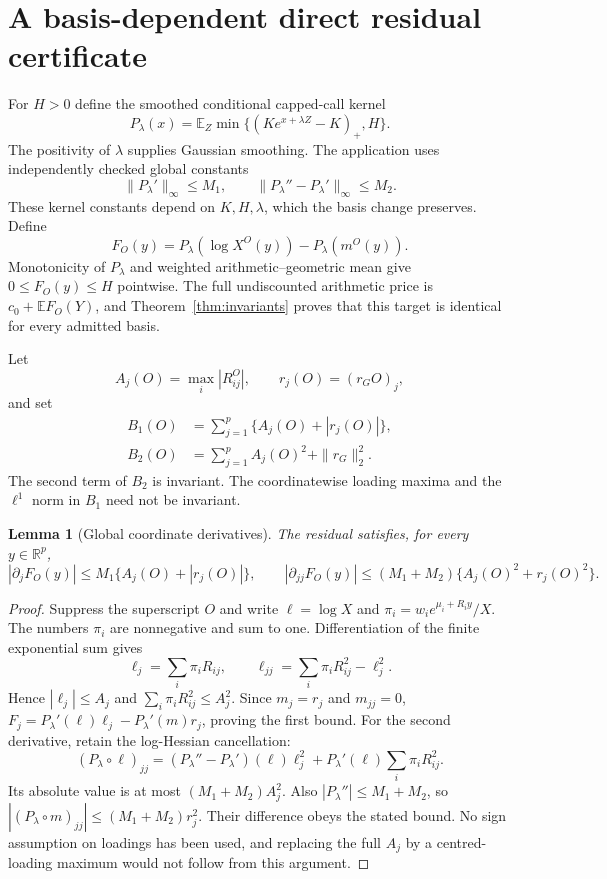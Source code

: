 \documentclass[11pt,a4paper]{article}
\newtheorem{lemma}[theorem]{Lemma}
\newcommand{\E}{\mathbb E}
\newcommand{\R}{\mathbb R}
\begin{document}
\section{A basis-dependent direct residual certificate}
For $H>0$ define the smoothed conditional capped-call kernel
\[
 P_\lambda(x)=\E_Z\min\{(Ke^{x+\lambda Z}-K)_+,H\}.
\]
The positivity of $\lambda$ supplies Gaussian smoothing. The application
uses independently checked global constants
\[
 \|P_\lambda'\|_\infty\leq M_1,
 \qquad \|P_\lambda''-P_\lambda'\|_\infty\leq M_2.
\]
These kernel constants depend on $K,H,\lambda$, which the basis change
preserves. Define
\[
 F_O(y)=P_\lambda(\log X^O(y))-P_\lambda(m^O(y)).
\]
Monotonicity of $P_\lambda$ and weighted arithmetic--geometric mean
give $0\leq F_O(y)\leq H$ pointwise. The full undiscounted arithmetic
price is $c_0+\E F_O(Y)$, and Theorem~\ref{thm:invariants} proves that this
target is identical for every admitted basis.

Let
\[
 A_j(O)=\max_i|R^O_{ij}|,\qquad r_j(O)=(r_GO)_j,
\]
and set
\begin{align*}
 B_1(O)&=\sum_{j=1}^p\{A_j(O)+|r_j(O)|\},\\
 B_2(O)&=\sum_{j=1}^p A_j(O)^2+\|r_G\|_2^2.
\end{align*}
The second term of $B_2$ is invariant. The coordinatewise loading maxima
and the $\ell^1$ norm in $B_1$ need not be invariant.

\begin{lemma}[Global coordinate derivatives]\label{lem:derivatives}
The residual satisfies, for every $y\in\R^p$,
\[
 |\partial_j F_O(y)|\leq M_1\{A_j(O)+|r_j(O)|\},
 \qquad
 |\partial_{jj}F_O(y)|\leq (M_1+M_2)
                  \{A_j(O)^2+r_j(O)^2\}.
\]
\end{lemma}
\begin{proof}
Suppress the superscript $O$ and write $\ell=\log X$ and
$\pi_i=w_i e^{\mu_i+R_i y}/X$. The numbers $\pi_i$ are nonnegative and
sum to one. Differentiation of the finite exponential sum gives
\[
 \ell_j=\sum_i\pi_iR_{ij},\qquad
 \ell_{jj}=\sum_i\pi_iR_{ij}^2-\ell_j^2.
\]
Hence $|\ell_j|\leq A_j$ and
$\sum_i\pi_iR_{ij}^2\leq A_j^2$. Since $m_j=r_j$ and $m_{jj}=0$,
$F_j=P_\lambda'(\ell)\ell_j-P_\lambda'(m)r_j$, proving the first bound.
For the second derivative, retain the log-Hessian cancellation:
\[
 (P_\lambda\circ\ell)_{jj}
 =(P_\lambda''-P_\lambda')(\ell)\ell_j^2
   +P_\lambda'(\ell)\sum_i\pi_i R_{ij}^2.
\]
Its absolute value is at most $(M_1+M_2)A_j^2$.
Also $|P_\lambda''|\leq M_1+M_2$, so
$|(P_\lambda\circ m)_{jj}|\leq(M_1+M_2)r_j^2$.
Their difference obeys the stated bound. No sign assumption on loadings
has been used, and replacing the full $A_j$ by a centred-loading maximum
would not follow from this argument.
\end{proof}
\end{document}
